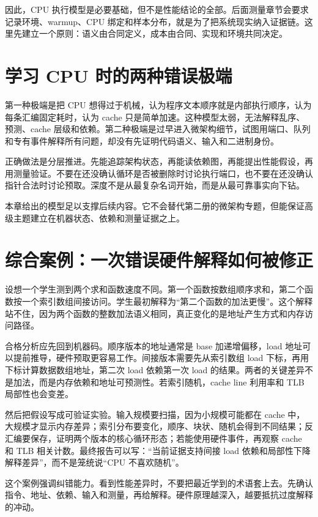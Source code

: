 因此，CPU 执行模型是必要基础，但不是性能结论的全部。后面测量章节会要求记录环境、warmup、CPU 绑定和样本分布，就是为了把系统现实纳入证据链。这里先建立一个原则：语义由合同定义，成本由合同、实现和环境共同决定。

\section{学习 CPU 时的两种错误极端}

第一种极端是把 CPU 想得过于机械，认为程序文本顺序就是内部执行顺序，认为每条汇编固定耗时，认为 cache 只是简单加速。这种模型太弱，无法解释乱序、预测、cache 层级和依赖。第二种极端是过早进入微架构细节，试图用端口、队列和专有事件解释所有问题，却没有先证明代码语义、输入和二进制身份。

正确做法是分层推进。先能追踪架构状态，再能读依赖图，再能提出性能假设，再用测量验证。不要在还没确认循环是否被删除时讨论执行端口，也不要在还没确认指针合法时讨论预取。深度不是从最复杂名词开始，而是从最可靠事实向下钻。

本章给出的模型足以支撑后续内容。它不会替代第二册的微架构专题，但能保证高级主题建立在机器状态、依赖和测量证据之上。

\section{综合案例：一次错误硬件解释如何被修正}

设想一个学生测到两个求和函数速度不同。第一个函数按数组顺序求和，第二个函数按一个索引数组间接访问。学生最初解释为“第二个函数的加法更慢”。这个解释站不住，因为两个函数的整数加法语义相同，真正变化的是地址产生方式和内存访问路径。

合格分析应先回到机器码。顺序版本的地址通常是 base 加递增偏移，load 地址可以提前推导，硬件预取更容易工作。间接版本需要先从索引数组 load 下标，再用下标计算数据数组地址，第二次 load 依赖第一次 load 的结果。两者的关键差异不是加法，而是内存依赖和地址可预测性。若索引随机，cache line 利用率和 TLB 局部性也会变差。

然后把假设写成可验证实验。输入规模要扫描，因为小规模可能都在 cache 中，大规模才显示内存差异；索引分布要变化，顺序、块状、随机会得到不同结果；反汇编要保存，证明两个版本的核心循环形态；若能使用硬件事件，再观察 cache 和 TLB 相关计数。最终报告可以写：“当前证据支持间接 load 依赖和局部性下降解释差异”，而不是笼统说“CPU 不喜欢随机”。

这个案例强调纠错能力。看到性能差异时，不要把最近学到的术语套上去。先确认指令、地址、依赖、输入和测量，再给解释。硬件原理越深入，越要抵抗过度解释的冲动。

